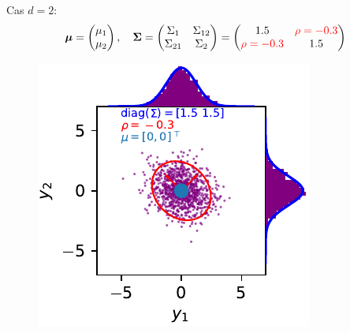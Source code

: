 \documentclass[xcolor=svgnames, t]{beamer}
\newcommand{\vectorx}[1]{\boldsymbol{\MakeLowercase{\mathbf{#1}}}}
\newcommand{\matrixx}[1]{\boldsymbol{\MakeUppercase{#1}}}
\begin{document}
\begin{frame}{\subsecname}
  Cas $d=2$:
  \begin{equation*}
    \vectorx{\mu}
    =
    \begin{pmatrix}
      \mu_1 \\
      \mu_2
    \end{pmatrix},
    \quad
    \matrixx{\Sigma}
    =
      \begin{pmatrix}
        \Sigma_{1} & \Sigma_{12} \\
        \Sigma_{21} & \Sigma_{2}
      \end{pmatrix}
    =
      \begin{pmatrix}
        1.5 & \color{red}\rho = -0.3 \\
        \color{red}\rho = -0.3 & 1.5
      \end{pmatrix}
  \end{equation*}
% 
  \begin{figure}
    \includegraphics{gaussian_2d_rho_low.pdf}
  \end{figure}
\end{frame}
\end{document}
